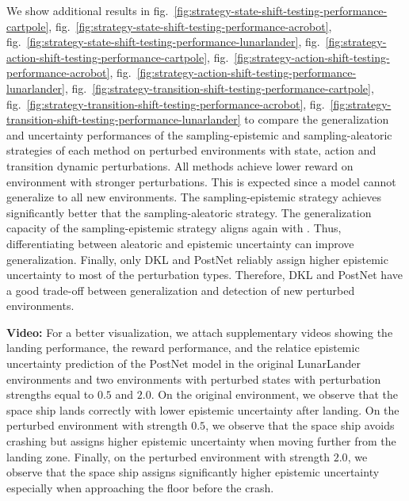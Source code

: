 We show additional results in fig.~\ref{fig:strategy-state-shift-testing-performance-cartpole}, fig.~\ref{fig:strategy-state-shift-testing-performance-acrobot}, fig.~\ref{fig:strategy-state-shift-testing-performance-lunarlander}, fig.~\ref{fig:strategy-action-shift-testing-performance-cartpole}, fig.~\ref{fig:strategy-action-shift-testing-performance-acrobot}, fig.~\ref{fig:strategy-action-shift-testing-performance-lunarlander}, fig.~\ref{fig:strategy-transition-shift-testing-performance-cartpole}, fig.~\ref{fig:strategy-transition-shift-testing-performance-acrobot}, fig.~\ref{fig:strategy-transition-shift-testing-performance-lunarlander} to compare the generalization and uncertainty performances of the sampling-epistemic and sampling-aleatoric strategies of each method on perturbed environments with state, action and transition dynamic perturbations. All methods achieve lower reward on environment with stronger perturbations. This is expected since a model cannot generalize to all new environments. The sampling-epistemic strategy achieves significantly better that the sampling-aleatoric strategy. The generalization capacity of the sampling-epistemic strategy aligns again with \cite{epistemic-pomdp}. Thus, differentiating between aleatoric and epistemic uncertainty can improve generalization. Finally, only DKL and PostNet reliably assign higher epistemic uncertainty to most of the perturbation types. Therefore, DKL and PostNet have a good trade-off between generalization and detection of new perturbed environments.

\textbf{Video:} For a better visualization, we attach supplementary videos showing the landing performance, the reward performance, and the relatice epistemic uncertainty prediction of the PostNet model in the original LunarLander environments and two environments with perturbed states with perturbation strengths equal to $0.5$ and $2.0$. On the original environment, we observe that the space ship lands correctly with lower epistemic uncertainty after landing. On the perturbed environment with strength $0.5$, we observe that the space ship avoids crashing but assigns higher epistemic uncertainty when moving further from the landing zone. Finally, on the perturbed environment with strength $2.0$, we observe that the space ship assigns significantly higher epistemic uncertainty especially when approaching the floor before the crash.











